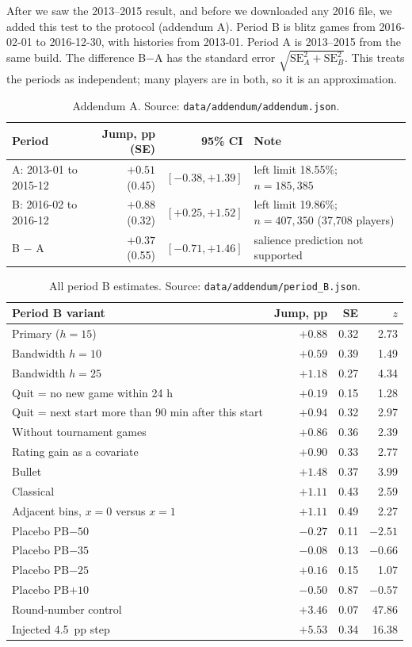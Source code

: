 \documentclass[11pt]{article}
\begin{document}
After we saw the 2013--2015 result, and before we downloaded any 2016 file, we added this test to the protocol (addendum A). Period B is blitz games from 2016-02-01 to 2016-12-30, with histories from 2013-01. Period A is 2013--2015 from the same build. The difference B$-$A has the standard error $\sqrt{\mathrm{SE}_A^2 + \mathrm{SE}_B^2}$. This treats the periods as independent; many players are in both, so it is an approximation.

\begin{table}[h]
\centering
\small
\begin{tabular}{lrrp{5.6cm}}
\toprule
Period & Jump, pp (SE) & 95\% CI & Note \\
\midrule
A: 2013-01 to 2015-12 & $+0.51$ (0.45) & $[-0.38, +1.39]$ & left limit 18.55\%; $n=185{,}385$ \\
B: 2016-02 to 2016-12 & $+0.88$ (0.32) & $[+0.25, +1.52]$ & left limit 19.86\%; $n=407{,}350$ (37,708 players) \\
B $-$ A & $+0.37$ (0.55) & $[-0.71, +1.46]$ & salience prediction not supported \\
\bottomrule
\end{tabular}
\caption{Addendum A. Source: \texttt{data/addendum/addendum.json}.}
\label{tab:2016}
\end{table}

\begin{table}[h]
\centering
\small
\begin{tabular}{lrrr}
\toprule
Period B variant & Jump, pp & SE & $z$ \\
\midrule
Primary ($h=15$) & $+0.88$ & 0.32 & 2.73 \\
Bandwidth $h = 10$ & $+0.59$ & 0.39 & 1.49 \\
Bandwidth $h = 25$ & $+1.18$ & 0.27 & 4.34 \\
Quit = no new game within 24 h & $+0.19$ & 0.15 & 1.28 \\
Quit = next start more than 90 min after this start & $+0.94$ & 0.32 & 2.97 \\
Without tournament games & $+0.86$ & 0.36 & 2.39 \\
Rating gain as a covariate & $+0.90$ & 0.33 & 2.77 \\
Bullet & $+1.48$ & 0.37 & 3.99 \\
Classical & $+1.11$ & 0.43 & 2.59 \\
Adjacent bins, $x=0$ versus $x=1$ & $+1.11$ & 0.49 & 2.27 \\
\midrule
Placebo PB$-50$ & $-0.27$ & 0.11 & $-2.51$ \\
Placebo PB$-35$ & $-0.08$ & 0.13 & $-0.66$ \\
Placebo PB$-25$ & $+0.16$ & 0.15 & 1.07 \\
Placebo PB$+10$ & $-0.50$ & 0.87 & $-0.57$ \\
Round-number control & $+3.46$ & 0.07 & 47.86 \\
Injected 4.5~pp step & $+5.53$ & 0.34 & 16.38 \\
\bottomrule
\end{tabular}
\caption{All period B estimates. Source: \texttt{data/addendum/period\_B.json}.}
\label{tab:2016rob}
\end{table}
\end{document}
